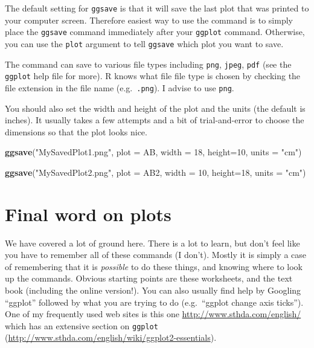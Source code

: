 \documentclass[
  a4paperpaper,
]{book}
\newenvironment{Shaded}{\begin{snugshade}}{\end{snugshade}}
\newcommand{\DataTypeTok}[1]{\textcolor[rgb]{0.13,0.29,0.53}{#1}}
\newcommand{\DecValTok}[1]{\textcolor[rgb]{0.00,0.00,0.81}{#1}}
\newcommand{\KeywordTok}[1]{\textcolor[rgb]{0.13,0.29,0.53}{\textbf{#1}}}
\newcommand{\NormalTok}[1]{#1}
\newcommand{\StringTok}[1]{\textcolor[rgb]{0.31,0.60,0.02}{#1}}
\begin{document}
The default setting for \texttt{ggsave} is that it will save the last plot that was printed to your computer screen. Therefore easiest way to use the command is to simply place the \texttt{ggsave} command immediately after your \texttt{ggplot} command. Otherwise, you can use the \texttt{plot} argument to tell \texttt{ggsave} which plot you want to save.

The command can save to various file types including \texttt{png}, \texttt{jpeg}, \texttt{pdf} (see the \texttt{ggplot} help file for more). R knows what file file type is chosen by checking the file extension in the file name (e.g.~\texttt{.png}). I advise to use \texttt{png}.

You should also set the width and height of the plot and the units (the default is inches). It usually takes a few attempts and a bit of trial-and-error to choose the dimensions so that the plot looks nice.

\begin{Shaded}
\begin{Highlighting}[]
\KeywordTok{ggsave}\NormalTok{(}\StringTok{"MySavedPlot1.png"}\NormalTok{, }\DataTypeTok{plot =}\NormalTok{ AB, }\DataTypeTok{width =} \DecValTok{18}\NormalTok{, }\DataTypeTok{height=}\DecValTok{10}\NormalTok{, }\DataTypeTok{units =} \StringTok{"cm"}\NormalTok{)}

\KeywordTok{ggsave}\NormalTok{(}\StringTok{"MySavedPlot2.png"}\NormalTok{, }\DataTypeTok{plot =}\NormalTok{ AB2, }\DataTypeTok{width =} \DecValTok{10}\NormalTok{, }\DataTypeTok{height=}\DecValTok{18}\NormalTok{, }\DataTypeTok{units =} \StringTok{"cm"}\NormalTok{)}
\end{Highlighting}
\end{Shaded}

\hypertarget{final-word-on-plots}{%
\section{Final word on plots}\label{final-word-on-plots}}

We have covered a lot of ground here. There is a lot to learn, but don't feel like you have to remember all of these commands (I don't). Mostly it is simply a case of remembering that it is \emph{possible} to do these things, and knowing where to look up the commands. Obvious starting points are these worksheets, and the text book (including the online version!). You can also usually find help by Googling ``ggplot'' followed by what you are trying to do (e.g.~``ggplot change axis ticks''). One of my frequently used web sites is this one \url{http://www.sthda.com/english/} which has an extensive section on \texttt{ggplot} (\url{http://www.sthda.com/english/wiki/ggplot2-essentials}).
\end{document}
